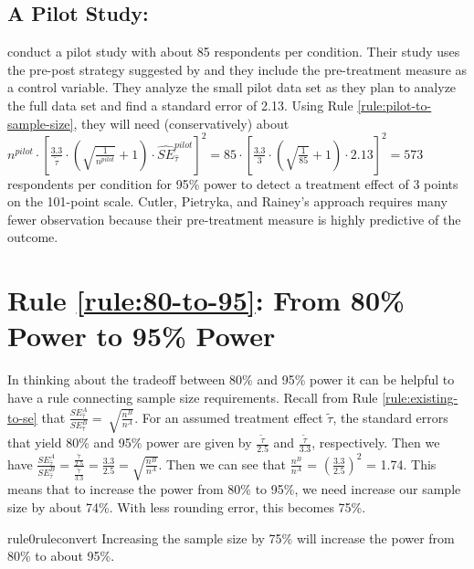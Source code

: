 \documentclass[12pt]{article}
\begin{document}
\subsection*{A Pilot Study: \cite{Culter2024}}

\cite{Culter2024} conduct a pilot study with about 85 respondents per condition. 
Their study uses the pre-post strategy suggested by \cite{Clifford2021} and they include the pre-treatment measure as a control variable. 
They analyze the small pilot data set as they plan to analyze the full data set and find a standard error of 2.13. 
Using Rule \ref{rule:pilot-to-sample-size}, they will need (conservatively) about
$n^{pilot} \cdot \left\lbrack \frac{3.3}{\widetilde{\tau}} \cdot \left( \sqrt{\frac{1}{n^{pilot}}} + 1 \right) \cdot {\widehat{SE}}_{\widehat{\tau}}^{pilot} \right\rbrack^{2} = 85 \cdot \left\lbrack \frac{3.3}{3} \cdot \left( \sqrt{\frac{1}{85}} + 1 \right) \cdot 2.13 \right\rbrack^{2} = 573$ respondents per condition for 95\% power to detect a treatment effect of 3 points on the 101-point scale. Cutler, Pietryka, and Rainey's approach requires many fewer observation because their pre-treatment measure is highly predictive of the outcome.

\section*{Rule \ref{rule:80-to-95}: From 80\% Power to 95\% Power}

In thinking about the tradeoff between 80\% and 95\% power it can be helpful to have a rule connecting sample size requirements. 
Recall from
Rule \ref{rule:existing-to-se} that $\frac{SE_{\widehat{\tau}}^{A}}{SE_{\widehat{\tau}}^{B}} = \ \sqrt{\frac{n^{B}}{n^{A}}}$.
For an assumed treatment effect $\widetilde{\tau}$, the standard errors that yield 80\% and 95\% power are given by $\frac{\widetilde{\tau}}{2.5}$
and $\frac{\widetilde{\tau}}{3.3}$, respectively. 
Then we have $\frac{SE_{\widehat{\tau}}^{A}}{SE_{\widehat{\tau}}^{B}} = \frac{\frac{\widetilde{\tau}}{2.5}}{\frac{\widetilde{\tau}}{3.3}} = \frac{3.3}{2.5} = \sqrt{\frac{n^{B}}{n^{A}}}$.
Then we can see that $\frac{n^{B}}{n^{A}}$ = $\left( \frac{3.3}{2.5} \right)^{2}$ = 1.74. This means that to increase the power from 80\% to 95\%, we need increase our sample size by about 74\%. 
With less rounding error, this becomes 75\%.

\begin{restatable}[80\% to 95\% Power]{rule0}{ruleconvert}
\label{rule:80-to-95}
Increasing the sample size by 75\% will increase the power from 80\% to about 95\%.
\end{restatable}
\end{document}
